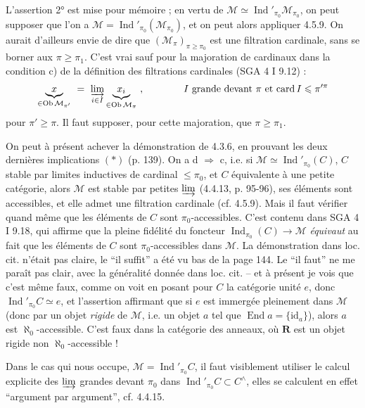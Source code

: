 \documentclass[11pt]{article}
\newcommand{\msp}[1]{\marginpar{\footnotesize [#1]}}
\newcommand{\Ind}{\operatorname{Ind}}
\begin{document}
L'assertion 2° est mise pour mémoire ; en vertu de $\mathcal{M}\simeq\Ind'_{\pi_0}\mathcal{M}_{\pi_0}$, on peut supposer que l'on a $\mathcal{M}=\Ind'_{\pi_0}(\mathcal{M}_{\pi_0})$, et on peut alors appliquer 4.5.9. On aurait d'ailleurs envie de dire que $(\mathcal{M}_\pi)_{\pi\geqslant\pi_0}$ est une filtration cardinale, sans se borner aux $\pi\geqslant\pi_1$. C'est vrai sauf pour la majoration de cardinaux dans la condition c) de la définition des filtrations cardinales (SGA 4 I 9.12) :
\[
\underbrace{x}_{\in\operatorname{Ob}\mathcal{M}_{\pi'}} \ =\ \varinjlim_{i\in I}\underbrace{x_i}_{\in\operatorname{Ob}\mathcal{M}_{\pi}}\ , \qquad\qquad \text{$I$ grande devant $\pi$ et $\operatorname{card}I\leqslant\pi'^{\pi}$}
\]
pour $\pi'\geqslant\pi$. Il faut supposer, pour cette majoration, que $\pi\geqslant\pi_1$.

\msp{page 147}

On peut à présent achever la démonstration de 4.3.6, en prouvant les deux dernières implications $(*)$ (p. 139). On a d $\Longrightarrow$ c, i.e. si $\mathcal{M}\simeq\Ind'_{\pi_0}(C)$, $C$ stable par limites inductives de cardinal $\leqslant\pi_0$, et $C$ équivalente à une petite catégorie, alors $\mathcal{M}$ est stable par petites $\varinjlim$ (4.4.13, p. 95-96), ses éléments sont accessibles, et elle admet une filtration cardinale (cf. 4.5.9). Mais il faut vérifier quand même que les éléments de $C$ sont $\pi_0$-accessibles. C'est contenu dans SGA 4 I 9.18, qui affirme que la pleine fidélité du foncteur $\Ind_{\pi_0}(C)\longrightarrow\mathcal{M}$ \textit{équivaut} au fait que les éléments de $C$ sont $\pi_0$-accessibles dans $\mathcal{M}$. La démonstration dans loc. cit. n'était pas claire, le “il suffit” a été vu bas de la page 144. Le “il faut” ne me paraît pas clair, avec la généralité donnée dans loc. cit. – et à présent je vois que c'est même faux, comme on voit en posant pour $C$ la catégorie unité $e$, donc $\Ind'_{\pi_0}C\simeq e$, et l'assertion affirmant que si $e$ est immergée pleinement dans $\mathcal{M}$ (donc par un objet \textit{rigide} de $\mathcal{M}$, i.e. un objet $a$ tel que $\operatorname{End}a=\{\mathrm{id}_a\}$), alors $a$ est $\aleph_0$-accessible. C'est faux dans la catégorie des anneaux, où $\mathbf{R}$ est un objet rigide non $\aleph_0$-accessible !

\msp{page 148}

Dans le cas qui nous occupe, $\mathcal{M}=\Ind'_{\pi_0}C$, il faut visiblement utiliser le calcul explicite des $\varinjlim$ grandes devant $\pi_0$ dans $\Ind'_{\pi_0}C\subset C^{\wedge}$, elles se calculent en effet “argument par argument”, cf. 4.4.15.
\end{document}

